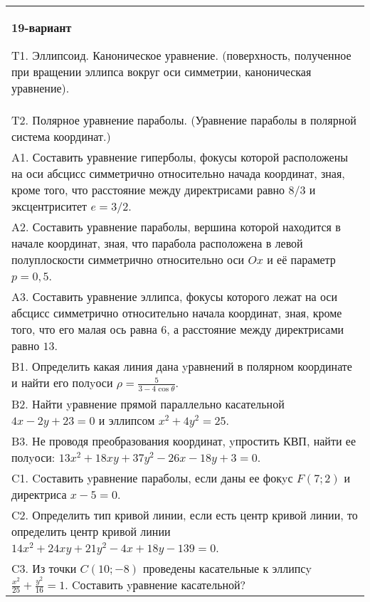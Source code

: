 \documentclass{article}
\begin{document}
\begin{tabular}{m{17cm}}
\textbf{19-вариант}
\newline

T1. Эллипсоид. Каноническое уравнение. (поверхность, полученное при вращении эллипса вокруг оси симметрии, каноническая уравнение).\\

T2. Полярное уравнение параболы. (Уравнение параболы в полярной система координат.)\\

A1. Составить уравнение гиперболы, фокусы которой расположены на оси абсцисс симметрично относительно начада координат, зная, кроме того, что расстояние между директрисами равно $8/3$ и эксцентриситет $e=3/2$.\\

A2. Составить уравнение параболы, вершина которой находится в начале координат, зная, что парабола расположена в левой полуплоскости симметрично относительно оси $Ox$ и её параметр $p=0,5$.\\

A3. Составить уравнение эллипса, фокусы которого лежат на оси абсцисс симметрично относительно начала координат, зная, кроме того, что его малая ось равна $6$, а расстояние между директрисами равно $13$.\\

B1. Определить какая линия дана yравнений в полярном координате и найти его полyоси $\rho = \frac{5}{3 - 4\cos\theta}$.  \\

B2. Найти yравнение прямой параллельно касательной $4x - 2y + 23 = 0$ и эллипсом $x^{2} + 4y^{2} = 25$.  \\

B3. Не проводя преобразования координат, yпростить КВП, найти ее полyоси: $13x^{2} + 18xy + 37y^{2} - 26x - 18y + 3 = 0$.  \\

C1. Cоставить yравнение параболы, если даны ее фокyс $F(7;2)$ и директриса $x-5=0$.  \\

C2. Определить тип кривой линии, если есть центр кривой линии, то определить центр кривой линии $14x^{2}+24xy+21y^{2}-4x+18y-139=0$.  \\

C3. Из точки $C(10;-8)$ проведены касательные к эллипсy $\frac{x^{2}}{25}+\frac{y^{2}}{16}=1$. Cоставить yравнение касательной?  \\

\end{tabular}
\vspace{1cm}
\end{document}
